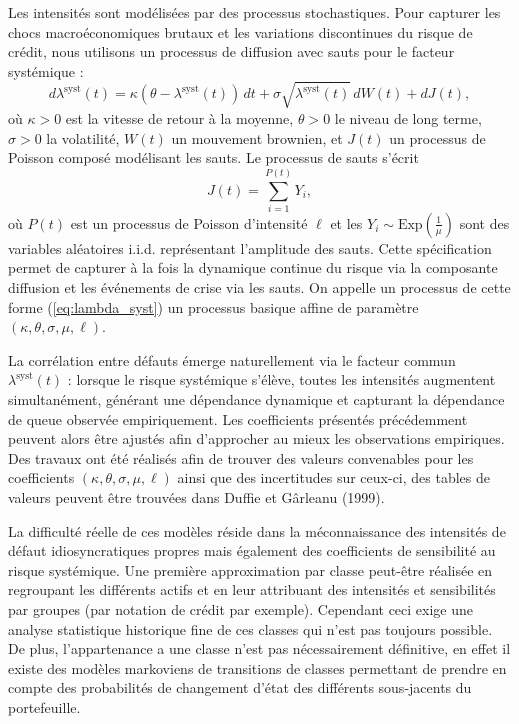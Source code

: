 Les intensités sont modélisées par des processus stochastiques. Pour capturer les chocs 
macroéconomiques brutaux et les variations discontinues du risque de crédit, nous 
utilisons un processus de diffusion avec sauts pour le facteur systémique :
\begin{equation}\label{eq:lambda_syst}
d\lambda^{\text{syst}}(t) = \kappa(\theta - \lambda^{\text{syst}}(t)) \, dt + \sigma \sqrt{\lambda^{\text{syst}}(t)} \, dW(t) + dJ(t),
\end{equation}
où $\kappa > 0$ est la vitesse de retour à la moyenne, $\theta > 0$ le niveau de long 
terme, $\sigma > 0$ la volatilité, $W(t)$ un mouvement brownien, et $J(t)$ un processus 
de Poisson composé modélisant les sauts. Le processus de sauts s'écrit
\begin{equation}
J(t) = \sum_{i=1}^{P(t)} Y_i,
\end{equation}
où $P(t)$ est un processus de Poisson d'intensité $\ell$ et les $Y_i \sim \text{Exp}\left(\frac{1}{\mu}\right)$ sont des 
variables aléatoires i.i.d. représentant l'amplitude des sauts. Cette spécification 
permet de capturer à la fois la dynamique continue du risque via la composante 
diffusion et les événements de crise via les sauts. On appelle un processus de cette
forme (\ref{eq:lambda_syst}) un processus basique affine de paramètre $(\kappa, \theta, \sigma
, \mu, \ell)$. \cite{DuffieGarleanu}

La corrélation entre défauts émerge naturellement via le facteur commun 
$\lambda^{\text{syst}}(t)$ : lorsque le risque systémique s'élève, toutes les 
intensités augmentent simultanément, générant une dépendance dynamique et capturant la 
dépendance de queue observée empiriquement. Les coefficients présentés précédemment peuvent alors
être ajustés afin d'approcher au mieux les observations empiriques. Des travaux ont été
réalisés afin de trouver des valeurs convenables pour les coefficients
$(\kappa, \theta, \sigma, \mu, \ell)$ ainsi que des incertitudes sur ceux-ci, des tables
de valeurs peuvent être trouvées dans Duffie et Gârleanu (1999).

La difficulté réelle de ces modèles réside dans la méconnaissance des intensités de défaut
idiosyncratiques propres mais également des coefficients de sensibilité au risque systémique.
Une première approximation par classe peut-être réalisée en regroupant les différents actifs
et en leur attribuant des intensités et sensibilités par groupes (par notation de crédit par exemple). 
Cependant ceci exige une analyse statistique historique fine de ces classes qui n'est pas toujours
possible. De plus, l'appartenance a une classe n'est pas nécessairement définitive, en effet il existe 
des modèles markoviens de transitions de classes permettant de prendre en compte des probabilités de
changement d'état des différents sous-jacents du portefeuille.

